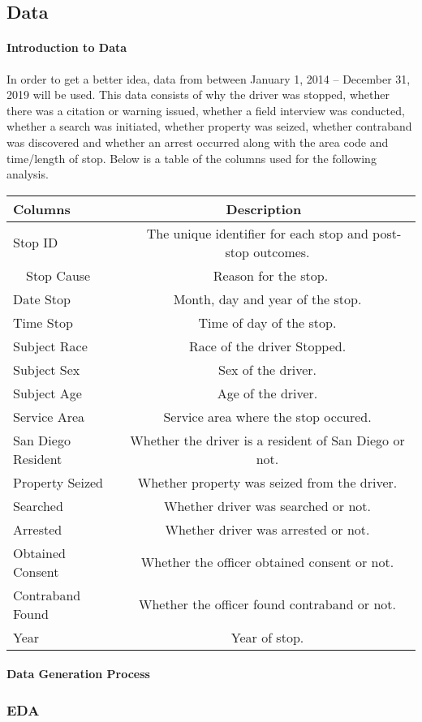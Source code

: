 \documentclass[11pt]{article}
\begin{document}
    \subsection{Data}\label{data}

    \paragraph{Introduction to Data}\label{introduction-to-data}

    In order to get a better idea, data from between January 1, 2014 --
December 31, 2019 will be used. This data consists of why the driver was
stopped, whether there was a citation or warning issued, whether a field
interview was conducted, whether a search was initiated, whether
property was seized, whether contraband was discovered and whether an
arrest occurred along with the area code and time/length of stop. Below
is a table of the columns used for the following analysis.

    \begin{longtable}[]{@{}lc@{}}
\toprule
Columns~~~ & ~~~~~Description~~~~~~\tabularnewline
\midrule
\endhead
Stop ID & ~~The unique identifier for each stop and post-stop
outcomes.\tabularnewline
~~Stop Cause & ~~~~Reason for the stop.~~~\tabularnewline
Date Stop & Month, day and year of the stop.\tabularnewline
Time Stop & Time of day of the stop.\tabularnewline
Subject Race~~ & Race of the driver Stopped.\tabularnewline
Subject Sex & Sex of the driver.\tabularnewline
Subject Age & Age of the driver.\tabularnewline
Service Area & Service area where the stop occured.\tabularnewline
San Diego Resident & Whether the driver is a resident of San Diego or
not.\tabularnewline
Property Seized & Whether property was seized from the
driver.\tabularnewline
Searched & Whether driver was searched or not.\tabularnewline
Arrested & Whether driver was arrested or not.\tabularnewline
Obtained Consent & Whether the officer obtained consent or
not.\tabularnewline
Contraband Found & Whether the officer found contraband or
not.\tabularnewline
Year & Year of stop.\tabularnewline
\bottomrule
\end{longtable}

    \paragraph{Data Generation Process}\label{data-generation-process}

    \subsubsection{EDA}\label{eda}
\end{document}
